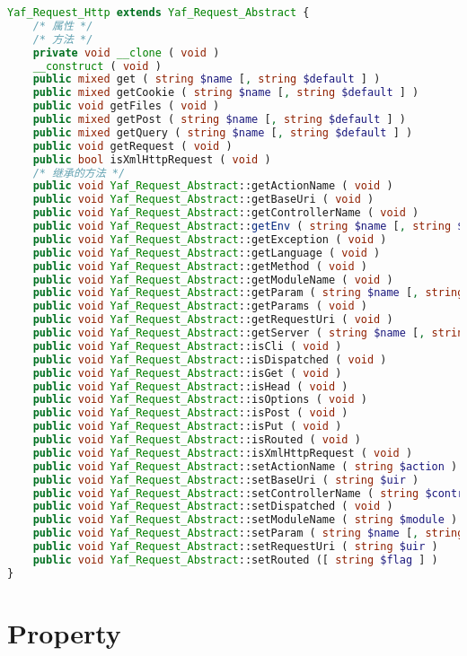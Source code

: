 \begin{lstlisting}[language=PHP]
Yaf_Request_Http extends Yaf_Request_Abstract {
    /* 属性 */
    /* 方法 */
    private void __clone ( void )
    __construct ( void )
    public mixed get ( string $name [, string $default ] )
    public mixed getCookie ( string $name [, string $default ] )
    public void getFiles ( void )
    public mixed getPost ( string $name [, string $default ] )
    public mixed getQuery ( string $name [, string $default ] )
    public void getRequest ( void )
    public bool isXmlHttpRequest ( void )
    /* 继承的方法 */
    public void Yaf_Request_Abstract::getActionName ( void )
    public void Yaf_Request_Abstract::getBaseUri ( void )
    public void Yaf_Request_Abstract::getControllerName ( void )
    public void Yaf_Request_Abstract::getEnv ( string $name [, string $default ] )
    public void Yaf_Request_Abstract::getException ( void )
    public void Yaf_Request_Abstract::getLanguage ( void )
    public void Yaf_Request_Abstract::getMethod ( void )
    public void Yaf_Request_Abstract::getModuleName ( void )
    public void Yaf_Request_Abstract::getParam ( string $name [, string $default ] )
    public void Yaf_Request_Abstract::getParams ( void )
    public void Yaf_Request_Abstract::getRequestUri ( void )
    public void Yaf_Request_Abstract::getServer ( string $name [, string $default ] )
    public void Yaf_Request_Abstract::isCli ( void )
    public void Yaf_Request_Abstract::isDispatched ( void )
    public void Yaf_Request_Abstract::isGet ( void )
    public void Yaf_Request_Abstract::isHead ( void )
    public void Yaf_Request_Abstract::isOptions ( void )
    public void Yaf_Request_Abstract::isPost ( void )
    public void Yaf_Request_Abstract::isPut ( void )
    public void Yaf_Request_Abstract::isRouted ( void )
    public void Yaf_Request_Abstract::isXmlHttpRequest ( void )
    public void Yaf_Request_Abstract::setActionName ( string $action )
    public void Yaf_Request_Abstract::setBaseUri ( string $uir )
    public void Yaf_Request_Abstract::setControllerName ( string $controller )
    public void Yaf_Request_Abstract::setDispatched ( void )
    public void Yaf_Request_Abstract::setModuleName ( string $module )
    public void Yaf_Request_Abstract::setParam ( string $name [, string $value ] )
    public void Yaf_Request_Abstract::setRequestUri ( string $uir )
    public void Yaf_Request_Abstract::setRouted ([ string $flag ] )
}
\end{lstlisting}

\section{Property}

